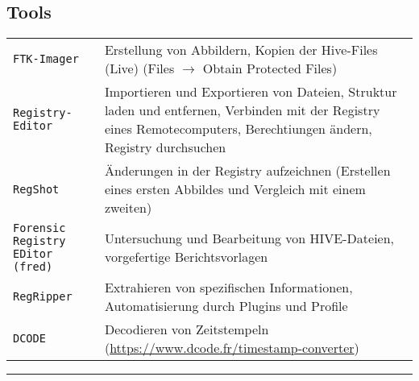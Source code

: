 \begin{multicols}{3}
\section{Tools}
\begin{tabular}{@{}p{\the\MyLen}%
		@{}p{\linewidth-\the\MyLen}@{}}
	\texttt{FTK-Imager} & Erstellung von Abbildern, Kopien der Hive-Files (Live) (Files $\rightarrow$ Obtain Protected Files)\\
	\texttt{Registry-Editor} & Importieren und Exportieren von Dateien, Struktur laden und entfernen, Verbinden mit der Registry eines Remotecomputers, Berechtiungen ändern, Registry durchsuchen\\
	\texttt{RegShot} & Änderungen in der Registry aufzeichnen (Erstellen eines ersten Abbildes und Vergleich mit einem zweiten)\\
	\texttt{Forensic Registry EDitor (fred)} & Untersuchung und Bearbeitung von HIVE-Dateien, vorgefertige Berichtsvorlagen\\
	\texttt{RegRipper} & Extrahieren von spezifischen Informationen, Automatisierung durch Plugins und Profile\\
	\texttt{DCODE} & Decodieren von Zeitstempeln (\url{https://www.dcode.fr/timestamp-converter})\\
\end{tabular}

\rule{0.3\linewidth}{0.25pt}
\scriptsize


\end{multicols}